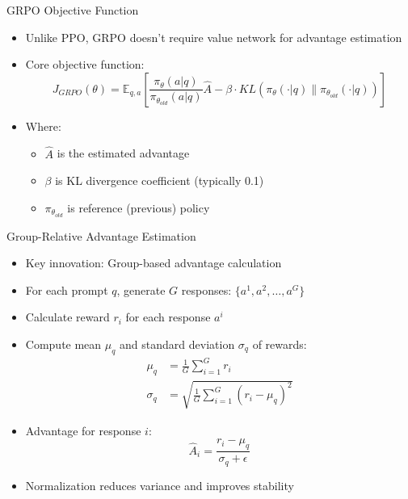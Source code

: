 \documentclass{beamer}
\begin{document}
\begin{frame}{GRPO Objective Function}
  \begin{itemize}
    \item Unlike PPO, GRPO doesn't require value network for advantage estimation
    \item Core objective function:
    \begin{equation}
      J_{GRPO}(\theta) = \mathbb{E}_{q,a} \left[ \frac{\pi_\theta(a|q)}{\pi_{\theta_{old}}(a|q)} \hat{A} - \beta \cdot KL(\pi_\theta(\cdot|q) \| \pi_{\theta_{old}}(\cdot|q)) \right]
    \end{equation}
    \item Where:
    \begin{itemize}
      \item $\hat{A}$ is the estimated advantage
      \item $\beta$ is KL divergence coefficient (typically 0.1)
      \item $\pi_{\theta_{old}}$ is reference (previous) policy
    \end{itemize}
  \end{itemize}
\end{frame}

\begin{frame}{Group-Relative Advantage Estimation}
  \begin{itemize}
    \item Key innovation: Group-based advantage calculation
    \item For each prompt $q$, generate $G$ responses: $\{a^1, a^2, \ldots, a^G\}$
    \item Calculate reward $r_i$ for each response $a^i$
    \item Compute mean $\mu_q$ and standard deviation $\sigma_q$ of rewards:
    \begin{align}
      \mu_q &= \frac{1}{G}\sum_{i=1}^{G} r_i \\
      \sigma_q &= \sqrt{\frac{1}{G}\sum_{i=1}^{G} (r_i - \mu_q)^2}
    \end{align}
    \item Advantage for response $i$:
    \begin{equation}
      \hat{A}_i = \frac{r_i - \mu_q}{\sigma_q + \epsilon}
    \end{equation}
    \item Normalization reduces variance and improves stability
  \end{itemize}
\end{frame}
\end{document}
